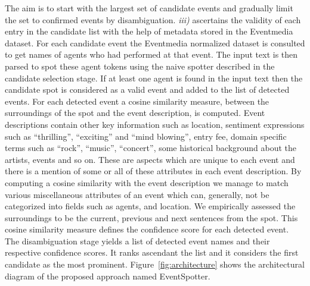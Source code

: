 \documentclass[10pt,a4paper]{article}
\begin{document}
The aim is to start with the largest set of candidate events and gradually limit the set to confirmed events by disambiguation. 
\textit{iii)} ascertains the validity of each entry in the candidate list with the help of metadata stored in the Eventmedia dataset. 
For each candidate event the Eventmedia normalized dataset is consulted to get names of agents who had performed at that event. The input text is then parsed to spot these agent tokens using the naive spotter described in the candidate selection stage. If at least one agent is found in the input text then the candidate spot is considered as a valid event and added to the list of detected events. For each detected event a cosine similarity measure,  between the surroundings of the spot and the event description, is computed. Event descriptions contain other key information such as location, sentiment expressions such as ``thrilling'', ``exciting'' and ``mind blowing'', entry fee, domain specific terms such as ``rock'', ``music'', ``concert'', some historical background about the artists, events and so on. These are aspects which are unique to each event and there is a mention of some or all of these attributes in each event description. By computing a cosine similarity with the event description we manage to match various miscellaneous attributes of an event which can, generally, not be categorized into fields such as agents, and location. We empirically assessed the surroundings to be the current, previous and next sentences from the spot. This cosine similarity measure defines the confidence score for each detected event. The disambiguation stage yields a list of detected event names and their respective confidence scores. It ranks ascendant the list and it considers the first candidate as the most prominent.
Figure~\ref{fig:architecture} shows the architectural diagram of the proposed approach named EventSpotter. 
\end{document}
